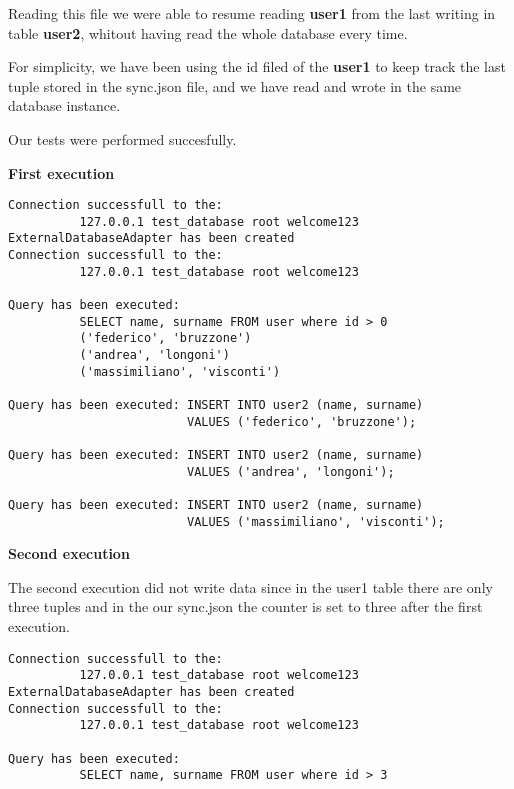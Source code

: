 Reading this file we were able to resume reading \textbf{user1} from the last writing in table \textbf{user2}, whitout having read the whole database every time.

For simplicity, we have been using the id filed of the \textbf{user1} to keep track the last tuple stored in the sync.json file, and we have read and wrote in the same database instance.

Our tests were performed succesfully.


\textbf{First execution}
\begin{lstlisting}
Connection successfull to the: 
          127.0.0.1 test_database root welcome123 
ExternalDatabaseAdapter has been created
Connection successfull to the: 
          127.0.0.1 test_database root welcome123 

Query has been executed: 
          SELECT name, surname FROM user where id > 0
          ('federico', 'bruzzone')
          ('andrea', 'longoni')
          ('massimiliano', 'visconti')

Query has been executed: INSERT INTO user2 (name, surname) 
                         VALUES ('federico', 'bruzzone');

Query has been executed: INSERT INTO user2 (name, surname) 
                         VALUES ('andrea', 'longoni');

Query has been executed: INSERT INTO user2 (name, surname) 
                         VALUES ('massimiliano', 'visconti');
\end{lstlisting}


\textbf{Second execution}

The second execution did not write data since in the user1 table there are only three tuples and in the our sync.json the counter is set to three after the first execution.

\begin{lstlisting}
Connection successfull to the: 
          127.0.0.1 test_database root welcome123 
ExternalDatabaseAdapter has been created
Connection successfull to the: 
          127.0.0.1 test_database root welcome123 

Query has been executed: 
          SELECT name, surname FROM user where id > 3
\end{lstlisting}
